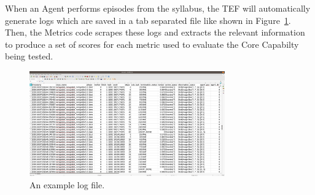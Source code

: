 When an Agent performs episodes from the syllabus, the TEF will automatically generate logs which are saved in a tab separated file like shown in Figure~\ref{fig:logfile}. Then, the Metrics code scrapes these logs and extracts the relevant information to produce a set of scores for each metric used to evaluate the Core Capabilty being tested.\\



\begin{figure}[h]
	\centering
	\includegraphics[width=0.75\textwidth]{sections/figs/log_file.png}
	\caption{An example log file.}
	\label{fig:logfile}
\end{figure}
